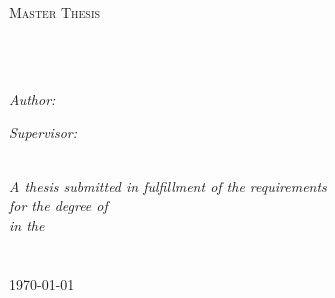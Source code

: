 \documentclass[
11pt, %
english, %
singlespacing, %
headsepline, %
]{MastersDoctoralThesis} %
\author{Jeremiah \textsc{van Oosten}} %
\begin{document}
\frontmatter %

\pagestyle{plain} %


\begin{titlepage}
\begin{center}

{\scshape\LARGE \univname\par}\vspace{1.5cm} %
\textsc{\Large Master Thesis}\\[0.5cm] %

\HRule \\[0.4cm] %
{\huge \bfseries \ttitle\par}\vspace{0.4cm} %
\HRule \\[1.5cm] %
 
\begin{minipage}[t]{0.4\textwidth}
\begin{flushleft} \large
\emph{Author:}\\
\authorname %
\end{flushleft}
\end{minipage}
\begin{minipage}[t]{0.4\textwidth}
\begin{flushright} \large
\emph{Supervisor:} \\
\supname %
\end{flushright}
\end{minipage}\\[3cm]
 
\large \textit{A thesis submitted in fulfillment of the requirements\\ for the degree of \degreename}\\[0.3cm] %
\textit{in the}\\[0.4cm]
\groupname\\\deptname\\[2cm] %
 
{\large \today}\\[4cm] %
 
\vfill
\end{center}
\end{titlepage}
\end{document}
